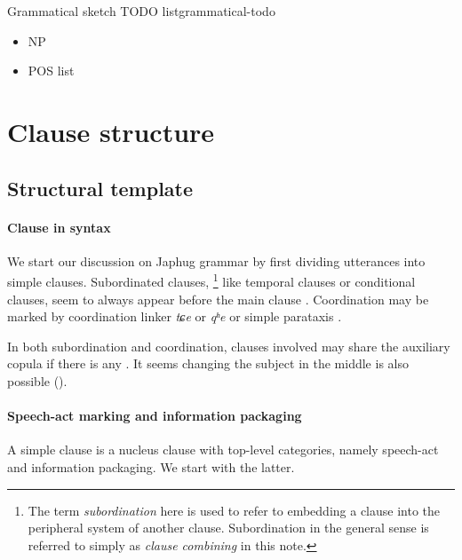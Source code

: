 \documentclass[a4paper, oneside, 12pt]{report}
\newcommand*{\citesec}[1]{\S~{#1}}
\newcommand*{\citechap}[1]{Ch~{#1}}
\newcommand*{\citepage}[1]{p.~{#1}}
\newcommand*{\term}[1]{\emph{#1}}
\newcommand{\form}[1]{\emph{#1}}
\begin{document}
\begin{todobox}{Grammatical sketch TODO list}{grammatical-todo}
    \begin{itemize}
        \item NP
        \item POS list
    \end{itemize}
\end{todobox}

\section{Clause structure}\label{sec:grammatical.clause}

\subsection{Structural template}\label{sec:grammatical.clause.template}

\paragraph*{Clause in syntax}
We start our discussion on Japhug grammar 
by first dividing utterances into simple clauses.
Subordinated clauses,%
\footnote{
    The term \term{subordination} here is used to refer to
    embedding a clause into the peripheral system of another clause.
    Subordination in the general sense is referred to simply as \term{clause combining} in this note.
}
like temporal clauses or conditional clauses,
seem to always appear before the main clause \citep[\citechap{25}]{jacques2021grammar}.
Coordination may be marked by coordination linker \form{tɕe} or \form{qʰe} or simple parataxis
\citep[\citesec{25.1.6}]{jacques2021grammar}.

In both subordination and coordination,
clauses involved may share the auxiliary copula if there is any
\citep[\citepage{47}, (40); \citepage{1091}, (10)]{jacques2021grammar}.
It seems changing the subject in the middle is also possible
().

\paragraph*{Speech-act marking and information packaging}
\label{sec:grammatical.clause.template.nucleus-identification}
A simple clause is a nucleus clause with top-level categories,
namely speech-act and information packaging.
We start with the latter.
\end{document}
